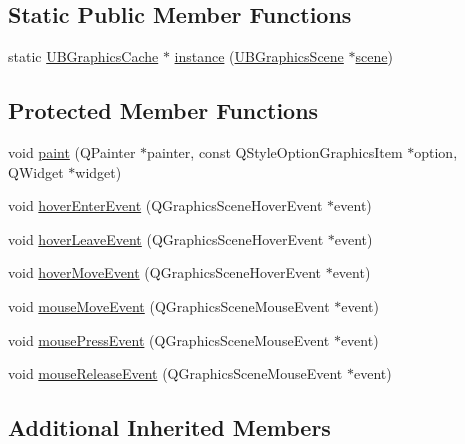 \subsection*{Static Public Member Functions}
\begin{DoxyCompactItemize}
\item 
static \hyperlink{class_u_b_graphics_cache}{U\-B\-Graphics\-Cache} $\ast$ \hyperlink{class_u_b_graphics_cache_af544095b94b560b72c01a84cf709bc14}{instance} (\hyperlink{class_u_b_graphics_scene}{U\-B\-Graphics\-Scene} $\ast$\hyperlink{class_u_b_item_a3aacc37e7f32b28047f771d0e6abc431}{scene})
\end{DoxyCompactItemize}
\subsection*{Protected Member Functions}
\begin{DoxyCompactItemize}
\item 
void \hyperlink{class_u_b_graphics_cache_ab4fb4a7a081fb482f5c806d9ab089619}{paint} (Q\-Painter $\ast$painter, const Q\-Style\-Option\-Graphics\-Item $\ast$option, Q\-Widget $\ast$widget)
\item 
void \hyperlink{class_u_b_graphics_cache_adf19ad04e270c17bb3af4e7b9299a06d}{hover\-Enter\-Event} (Q\-Graphics\-Scene\-Hover\-Event $\ast$event)
\item 
void \hyperlink{class_u_b_graphics_cache_ad36232c21000dddc606c26b2c0ed51a3}{hover\-Leave\-Event} (Q\-Graphics\-Scene\-Hover\-Event $\ast$event)
\item 
void \hyperlink{class_u_b_graphics_cache_a369a1a69ff2669aa36aae287ff9769f1}{hover\-Move\-Event} (Q\-Graphics\-Scene\-Hover\-Event $\ast$event)
\item 
void \hyperlink{class_u_b_graphics_cache_a57e514d857fbc73624c8c8a2b74b2f4e}{mouse\-Move\-Event} (Q\-Graphics\-Scene\-Mouse\-Event $\ast$event)
\item 
void \hyperlink{class_u_b_graphics_cache_aebdac7f272e9f6a8b74e29ceb29ff176}{mouse\-Press\-Event} (Q\-Graphics\-Scene\-Mouse\-Event $\ast$event)
\item 
void \hyperlink{class_u_b_graphics_cache_a5452fc56ed8ed91eae21dac7d5e40776}{mouse\-Release\-Event} (Q\-Graphics\-Scene\-Mouse\-Event $\ast$event)
\end{DoxyCompactItemize}
\subsection*{Additional Inherited Members}



